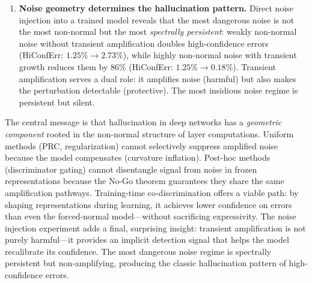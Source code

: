 \documentclass[11pt,a4paper]{article}
\theoremstyle{definition}
\begin{document}
\begin{enumerate}[nosep]
        vs.\ $0.009$) remains an open issue.
  \item \textbf{Noise geometry determines the hallucination pattern.}
        Direct noise injection into a trained model reveals that
        the most dangerous noise is not the most non-normal but the
        most \emph{spectrally persistent}: weakly non-normal noise
        without transient amplification doubles high-confidence
        errors (HiConfErr: $1.25\% \to 2.73\%$), while highly
        non-normal noise with transient growth reduces them by 86\%
        (HiConfErr: $1.25\% \to 0.18\%$). Transient amplification
        serves a dual role: it amplifies noise (harmful) but also
        makes the perturbation detectable (protective). The most
        insidious noise regime is persistent but silent.
\end{enumerate}

The central message is that hallucination in deep networks has a
\emph{geometric component} rooted in the non-normal structure of
layer computations. Uniform methods (PRC, regularization) cannot
selectively suppress amplified noise because the model compensates
(curvature inflation). Post-hoc methods (discriminator gating)
cannot disentangle signal from noise in frozen representations
because the No-Go theorem guarantees they share the same
amplification pathways. Training-time co-discrimination offers
a viable path: by shaping representations during learning, it
achieves lower confidence on errors than even the forced-normal
model---without sacrificing expressivity. The noise injection
experiment adds a final, surprising insight: transient amplification
is not purely harmful---it provides an implicit detection signal
that helps the model recalibrate its confidence. The most dangerous
noise regime is spectrally persistent but non-amplifying, producing
the classic hallucination pattern of high-confidence errors.
\end{document}
